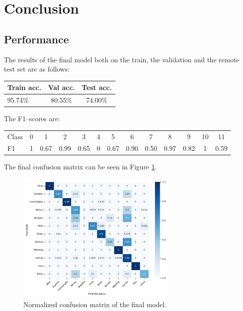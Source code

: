 \documentclass[conference,compsoc,11pt]{IEEEtran}
\begin{document}
\section{Conclusion}

\subsection{Performance}

The results of the final model both on the train, the validation and the remote test set are as follows:

\begin{center}
\begin{tabular}{ l c c }
\hline\hline
Train acc.  & Val acc.  & Test acc. \\
\hline
95.74\%     & 80.55\%   & 74.00\% \\
\hline\hline
\end{tabular}
\end{center}

\noindent The F1--scores are:

\begin{center}
\footnotesize
\setlength\tabcolsep{2pt}
\begin{tabular}{l|cccccccccccc}
\hline
Class & 0 & 1 & 2 & 3 & 4 & 5 & 6 & 7 & 8 & 9 & 10 & 11 \\
F1 & 1 & 0.67 & 0.99 & 0.65 & 0 & 0.67 & 0.90 & 0.50 & 0.97 & 0.82 & 1 & 0.59 \\
\hline
\end{tabular}
\end{center}


\noindent The final confusion matrix can be seen in Figure \ref{fig:confusion}.

\begin{figure}[h!]
\centering
\includegraphics[width=3.1in]{confusion_crazy_ensemble.pdf}
\caption{Normalized confusion matrix of the final model.}
\label{fig:confusion}
\end{figure}
\end{document}
